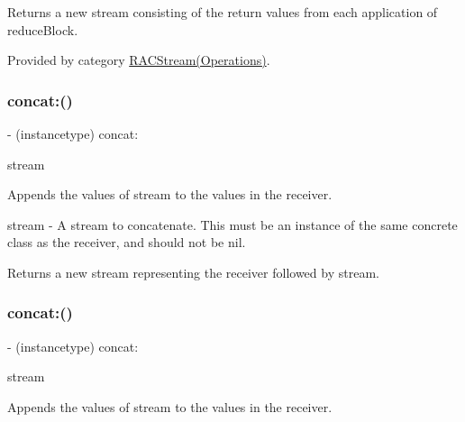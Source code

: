 Returns a new stream consisting of the return values from each application of {\ttfamily reduce\+Block}. 

Provided by category \mbox{\hyperlink{category_r_a_c_stream_07_operations_08_a698f6ef68be8d3cb34f9be6efaaa5af7}{R\+A\+C\+Stream(\+Operations)}}.

\mbox{\label{interface_r_a_c_stream_aa6ba0c467e804ce813a0c6b627043ec3}} 
\subsubsection{\texorpdfstring{concat\+:()}{concat:()}\hspace{0.1cm}{\footnotesize\ttfamily [1/3]}}
{\footnotesize\ttfamily -\/ (instancetype) concat\+: \begin{DoxyParamCaption}\item[{(\mbox{\hyperlink{interface_r_a_c_stream}{R\+A\+C\+Stream}} $\ast$)}]{stream }\end{DoxyParamCaption}}

Appends the values of {\ttfamily stream} to the values in the receiver.

stream -\/ A stream to concatenate. This must be an instance of the same concrete class as the receiver, and should not be {\ttfamily nil}.

Returns a new stream representing the receiver followed by {\ttfamily stream}. \mbox{\label{interface_r_a_c_stream_aa6ba0c467e804ce813a0c6b627043ec3}} 
\subsubsection{\texorpdfstring{concat\+:()}{concat:()}\hspace{0.1cm}{\footnotesize\ttfamily [2/3]}}
{\footnotesize\ttfamily -\/ (instancetype) concat\+: \begin{DoxyParamCaption}\item[{(\mbox{\hyperlink{interface_r_a_c_stream}{R\+A\+C\+Stream}} $\ast$)}]{stream }\end{DoxyParamCaption}}

Appends the values of {\ttfamily stream} to the values in the receiver.

